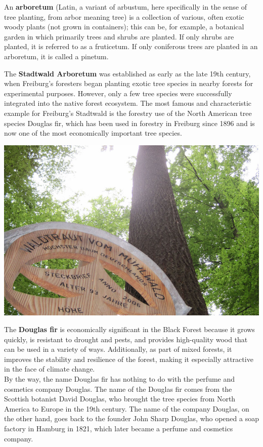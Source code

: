 \documentclass[landscape, a4paper]{article}
\newcommand\alert[1]{\textcolor{PrimaryColor}{\textbf{#1}}}
\begin{document}
\begin{minipage}[t]{0.31\textwidth}
    An \alert{arboretum} (Latin, a variant of arbustum, here specifically in the sense of tree planting, from arbor meaning tree) is a collection of various, often exotic woody plants (not grown in containers); this can be, for example, a botanical garden in which primarily trees and shrubs are planted. If only shrubs are planted, it is referred to as a fruticetum. If only coniferous trees are planted in an arboretum, it is called a pinetum.

\end{minipage}%
\hfill%
\vrule width 0.01cm
\hfill%
\begin{minipage}[t]{0.31\textwidth}
	\setlength{\parskip}{0.25cm}
  The \alert{Stadtwald Arboretum} was established as early as the late 19th century, when Freiburg's foresters began planting exotic tree species in nearby forests for experimental purposes. However, only a few tree species were successfully integrated into the native forest ecosystem. The most famous and characteristic example for Freiburg's Stadtwald is the forestry use of the North American tree species Douglas fir, which has been used in forestry in Freiburg since 1896 and is now one of the most economically important tree species.

	\includegraphics[width=\linewidth]{./figures/waldraud.png}
	\setlength{\parskip}{0.25cm}

  The \alert{Douglas fir} is economically significant in the Black Forest because it grows quickly, is resistant to drought and pests, and provides high-quality wood that can be used in a variety of ways. Additionally, as part of mixed forests, it improves the stability and resilience of the forest, making it especially attractive in the face of climate change.\\
By the way, the name Douglas fir has nothing to do with the perfume and cosmetics company Douglas. The name of the Douglas fir comes from the Scottish botanist David Douglas, who brought the tree species from North America to Europe in the 19th century. The name of the company Douglas, on the other hand, goes back to the founder John Sharp Douglas, who opened a soap factory in Hamburg in 1821, which later became a perfume and cosmetics company.


\end{minipage}
\end{document}
